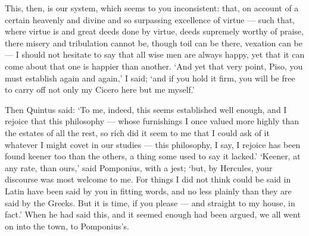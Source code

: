  This, then, is our system, which seems to you inconsistent: that, on account of a certain heavenly and divine and so surpassing excellence of virtue — such that, where virtue is and great deeds done by virtue, deeds supremely worthy of praise, there misery and tribulation cannot be, though toil can be there, vexation can be — I should not hesitate to say that all wise men are always happy, yet that it can come about that one is happier than another. ‘And yet that very point, Piso, you must establish again and again,’ I said; ‘and if you hold it firm, you will be free to carry off not only my Cicero here but me myself.’

 Then Quintus said: ‘To me, indeed, this seems established well enough, and I rejoice that this philosophy — whose furnishings I once valued more highly than the estates of all the rest, so rich did it seem to me that I could ask of it whatever I might covet in our studies — this philosophy, I say, I rejoice has been found keener too than the others, a thing some used to say it lacked.’ ‘Keener, at any rate, than ours,’ said Pomponius, with a jest; ‘but, by Hercules, your discourse was most welcome to me. For things I did not think could be said in Latin have been said by you in fitting words, and no less plainly than they are said by the Greeks. But it is time, if you please — and straight to my house, in fact.’ When he had said this, and it seemed enough had been argued, we all went on into the town, to Pomponius’s.

